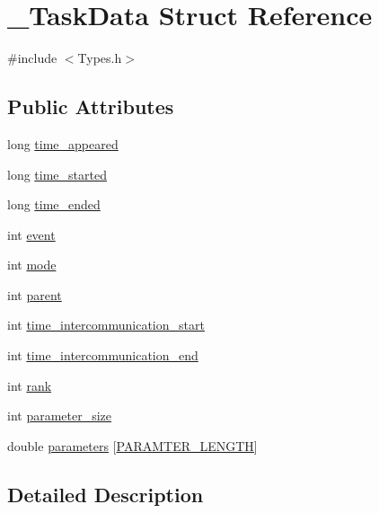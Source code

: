 \hypertarget{struct___task_data}{}\section{\+\_\+\+Task\+Data Struct Reference}
\label{struct___task_data}


{\ttfamily \#include $<$Types.\+h$>$}

\subsection*{Public Attributes}
\begin{DoxyCompactItemize}
\item 
long \hyperlink{struct___task_data_af954fddad12e02dc1ba32fa44827acdf}{time\+\_\+appeared}
\item 
long \hyperlink{struct___task_data_ab9e518445c80c9c67b60c1c69cbababb}{time\+\_\+started}
\item 
long \hyperlink{struct___task_data_a0bc3b4e0101f278c855489ac8b3b506d}{time\+\_\+ended}
\item 
int \hyperlink{struct___task_data_ae1f49893cada58856984c697da7ff4da}{event}
\item 
int \hyperlink{struct___task_data_a59a493e22491be546a2c4085525731f5}{mode}
\item 
int \hyperlink{struct___task_data_a2cfbd4d6957b551f50fc492a70c52c39}{parent}
\item 
int \hyperlink{struct___task_data_adb747fb823315a3d5cd6d2837dda7acf}{time\+\_\+intercommunication\+\_\+start}
\item 
int \hyperlink{struct___task_data_a67f91b17345e5d837d53f13561f52d5a}{time\+\_\+intercommunication\+\_\+end}
\item 
int \hyperlink{struct___task_data_acdd53806c2d65870377b46006e51b0f1}{rank}
\item 
int \hyperlink{struct___task_data_a9c9353c4ab3af86ea6865ad8dff936b2}{parameter\+\_\+size}
\item 
double \hyperlink{struct___task_data_a351f7ab8dbcf6fec356c0db2ded099da}{parameters} \mbox{[}\hyperlink{_types_extern_8h_a5fd5639a688c3c7ecd8243b9509be62d}{P\+A\+R\+A\+M\+T\+E\+R\+\_\+\+L\+E\+N\+G\+T\+H}\mbox{]}
\end{DoxyCompactItemize}


\subsection{Detailed Description}


